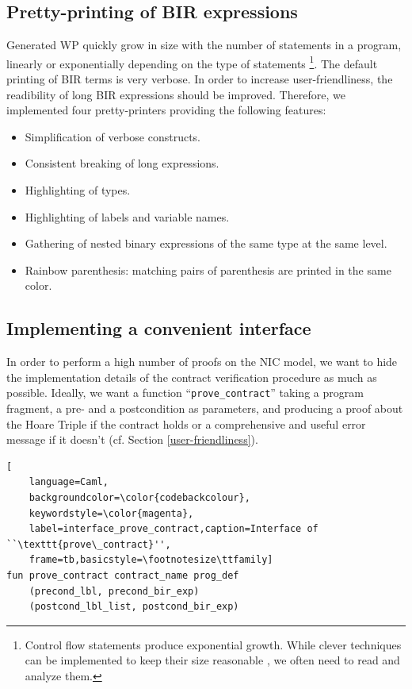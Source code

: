 \documentclass[10pt,a4paper]{article}
\begin{document}
\begin{multicols}{2}
\subsection{Pretty-printing of BIR expressions} \label{pretty-printers}

Generated WP quickly grow in size with the number of statements in a program, linearly or exponentially depending on the type of statements \footnote{Control flow statements produce exponential growth. While clever techniques can be implemented to keep their size reasonable \cite{lindner_trabin:_2019}, we often need to read and analyze them.}. The default printing of BIR terms is very verbose. In order to increase user-friendliness, the readibility of long BIR expressions should be improved. Therefore, we implemented four pretty-printers providing the following features:

\begin{itemize}
    \item Simplification of verbose constructs.
    \item Consistent breaking of long expressions.
    \item Highlighting of types.
    \item Highlighting of labels and variable names.
    \item Gathering of nested binary expressions of the same type at the same level.
    \item Rainbow parenthesis: matching pairs of parenthesis are printed in the same color.
\end{itemize}

\subsection{Implementing a convenient interface} \label{impl_convenient_ht_interface}

In order to perform a high number of proofs on the {NIC} model, we want to hide the implementation details of the contract verification procedure as much as possible. Ideally, we want a function ``\texttt{prove\_contract}'' taking a program fragment, a pre- and a postcondition as parameters, and producing a proof about the Hoare Triple if the contract holds or a comprehensive and useful error message if it doesn't (cf. Section \ref{user-friendliness}).
%
\begin{lstlisting}[
    language=Caml,
    backgroundcolor=\color{codebackcolour},
    keywordstyle=\color{magenta},
    label=interface_prove_contract,caption=Interface of ``\texttt{prove\_contract}'',
    frame=tb,basicstyle=\footnotesize\ttfamily]
fun prove_contract contract_name prog_def
    (precond_lbl, precond_bir_exp)
    (postcond_lbl_list, postcond_bir_exp)
\end{lstlisting}


\end{multicols}
\end{document}
